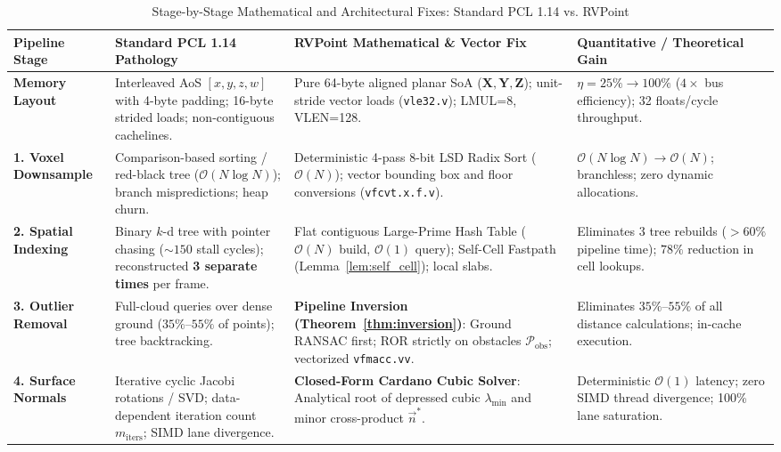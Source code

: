 \documentclass[11pt,a4paper]{article}
\begin{document}
\begin{table}[ht]
\centering
\scriptsize
\renewcommand{\arraystretch}{1.3}
\caption{Stage-by-Stage Mathematical and Architectural Fixes: Standard PCL 1.14 vs. RVPoint}
\label{tab:pcl_vs_rvpoint_fixes}
\begin{tabular}{@{}p{2.2cm}p{4.2cm}p{5.5cm}p{3.1cm}@{}}
\toprule
\textbf{Pipeline Stage} & \textbf{Standard PCL 1.14 Pathology} & \textbf{RVPoint Mathematical \& Vector Fix} & \textbf{Quantitative / Theoretical Gain} \\ \midrule
\textbf{Memory Layout} &
Interleaved AoS $[x, y, z, w]$ with 4-byte padding; 16-byte strided loads; non-contiguous cachelines. &
Pure 64-byte aligned planar SoA ($\mathbf{X}, \mathbf{Y}, \mathbf{Z}$); unit-stride vector loads (\texttt{vle32.v}); LMUL=8, VLEN=128. &
$\eta = 25\% \to 100\%$ ($4\times$ bus efficiency); 32 floats/cycle throughput. \\ \midrule
\textbf{1. Voxel Downsample} &
Comparison-based sorting / red-black tree ($\mathcal{O}(N \log N)$); branch mispredictions; heap churn. &
Deterministic 4-pass 8-bit LSD Radix Sort ($\mathcal{O}(N)$); vector bounding box and floor conversions (\texttt{vfcvt.x.f.v}). &
$\mathcal{O}(N \log N) \to \mathcal{O}(N)$; branchless; zero dynamic allocations. \\ \midrule
\textbf{2. Spatial Indexing} &
Binary $k$-d tree with pointer chasing ($\sim 150$ stall cycles); reconstructed \textbf{3 separate times} per frame. &
Flat contiguous Large-Prime Hash Table ($\mathcal{O}(N)$ build, $\mathcal{O}(1)$ query); Self-Cell Fastpath (Lemma~\ref{lem:self_cell}); local slabs. &
Eliminates 3 tree rebuilds ($>60\%$ pipeline time); $78\%$ reduction in cell lookups. \\ \midrule
\textbf{3. Outlier Removal} &
Full-cloud queries over dense ground ($35\%\text{--}55\%$ of points); tree backtracking. &
\textbf{Pipeline Inversion (Theorem~\ref{thm:inversion})}: Ground RANSAC first; ROR strictly on obstacles $\mathcal{P}_{\text{obs}}$; vectorized \texttt{vfmacc.vv}. &
Eliminates $35\%\text{--}55\%$ of all distance calculations; in-cache execution. \\ \midrule
\textbf{4. Surface Normals} &
Iterative cyclic Jacobi rotations / SVD; data-dependent iteration count $m_{\text{iters}}$; SIMD lane divergence. &
\textbf{Closed-Form Cardano Cubic Solver}: Analytical root of depressed cubic $\lambda_{\min}$ and minor cross-product $\vec{n}^*$. &
Deterministic $\mathcal{O}(1)$ latency; zero SIMD thread divergence; 100\% lane saturation. \\ \midrule

\end{tabular}
\end{table}
\end{document}
